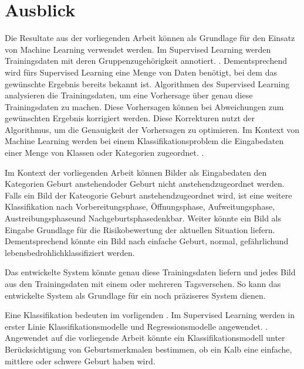 

\chapter{Ausblick}
Die Resultate aus der vorliegenden Arbeit können als Grundlage für den Einsatz von Machine Learning verwendet werden.
Im Supervised Learning werden Trainingsdaten mit deren Gruppenzugehörigkeit annotiert. \citep[S. 253]{Firouzi et al. 2020}. 
Dementsprechend wird fürs Supervised Learning eine Menge von Daten benötigt, bei dem das gewünschte Ergebnis bereits bekannt ist. Algorithmen des Supervised Learning analysieren die Trainingsdaten, um eine Vorhersage über genau diese Trainingsdaten zu machen. Diese Vorhersagen können bei Abweichungen zum gewünschten Ergebnis korrigiert werden. Diese Korrekturen nutzt der Algorithmus, um die Genauigkeit der Vorhersagen zu optimieren. Im Kontext von Machine Learning werden bei einem Klassifikationsproblem die Eingabedaten einer Menge von Klassen oder Kategorien zugeordnet. \citep[S. 440]{FernandezVillan2019}.

Im Kontext der vorliegenden Arbeit können Bilder als Eingabedaten den Kategorien \flqq Geburt anstehend\frqq oder \flqq Geburt nicht anstehend\frqq zugeordnet werden. Falls ein Bild der Kateogorie \flqq Geburt anstehend\frqq zugeordnet wird, ist eine weitere Klassifikation nach \flqq Vorbereitungsphase\frqq, \flqq Öffnungsphase\frqq, \flqq Aufweitungsphase\frqq, \flqq Austreibungsphase\frqq und \flqq Nachgeburtsphase\frqq denkbar. Weiter könnte ein Bild als Eingabe Grundlage für die Risikobewertung der aktuellen Situation liefern. Dementsprechend könnte ein Bild nach \flqq einfache Geburt\frqq, \flqq normal\frqq, \flqq gefährlich\frqq und \flqq lebensbedrohlich\frqq klassifiziert werden. 

Das entwickelte System könnte genau diese Trainingsdaten liefern und jedes Bild aus den Trainingsdaten mit einem oder mehreren \flqq Tags\frqq versehen. So kann das entwickelte System als Grundlage für ein noch präziseres System dienen.

Eine Klassifikation bedeuten im vorligenden 
. Im Supervised
Learning werden in erster Linie Klassifikationsmodelle und Regressionsmodelle
angewendet. . Angewendet auf die vorliegende Arbeit könnte ein
Klassifikationsmodell unter Berücksichtigung von Geburtsmerkmalen bestimmen,
ob ein Kalb eine einfache, mittlere oder schwere Geburt haben wird.

